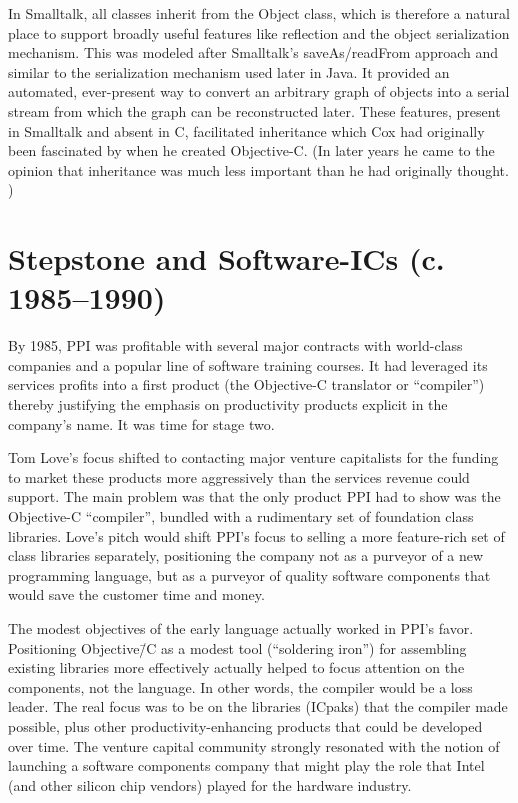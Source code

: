 \documentclass[acmsmall]{acmart}\settopmatter{}
\begin{document}
In Smalltalk, all classes inherit from the Object class, which is therefore a natural place to support broadly useful features like reflection and the object serialization mechanism. This was modeled after Smalltalk's saveAs/readFrom approach and similar to the serialization mechanism used later in Java. It provided an automated, ever-present way to convert an arbitrary graph of objects into a serial stream from which the graph can be reconstructed later. These features, present in Smalltalk and absent in C, facilitated inheritance which Cox had originally been fascinated by when he created Objective-C. (In later years he came to the opinion that inheritance was much less important than he had originally thought. \citetext{\citealp[259]{biancuzzi_objective-c_2009}; \citealp{cox_oral_2016}})
\section{Stepstone and Software-ICs (c. 1985--1990)}
\label{sec-stepstone_swIC}
By 1985, PPI was profitable with several major contracts with world-class companies and a popular line of software training courses. It had leveraged its services profits into a first product (the Objective-C translator or ``compiler'') thereby justifying the emphasis on productivity products explicit in the company's name. It was time for stage two.

Tom Love's focus shifted to contacting major venture capitalists for the funding to market these products more aggressively than the services revenue could support. The main problem was that the only product PPI had to show was the Objective-C ``compiler'', bundled with a rudimentary set of foundation class libraries. Love's pitch would shift PPI's focus to selling a more feature-rich set of class libraries separately, positioning the company not as a purveyor of a new programming language, but as a purveyor of quality software components that would save the customer time and money.

The modest objectives of the early language actually worked in PPI's favor. Positioning Objective\=/C as a modest tool (``soldering iron'') for assembling existing libraries more effectively actually helped to focus attention on the components, not the language. In other words, the compiler would be a loss leader. The real focus was to be on the libraries (ICpaks) that the compiler made possible, plus other productivity-enhancing products that could be developed over time. The venture capital community strongly resonated with the notion of launching a software components company that might play the role that Intel (and other silicon chip vendors) played for the hardware industry. 
\end{document}
